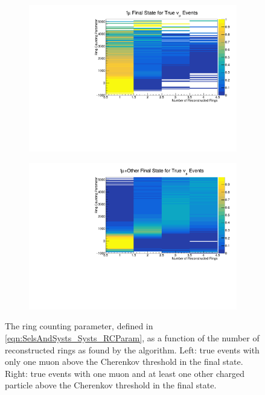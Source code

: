 \begin{figure}[h]
  \begin{subfigure}[t]{0.49\textwidth}
    \includegraphics[width=\textwidth, trim={0mm 0mm 0mm 0mm}, clip,page=1]{Figures/Selections/NuFlavour_14_Top_1.pdf}
  \end{subfigure}%
  \begin{subfigure}[t]{0.49\textwidth}
    \includegraphics[width=\textwidth, trim={0mm 0mm 0mm 0mm}, clip,page=1]{Figures/Selections/NuFlavour_14_Top_3.pdf}
  \end{subfigure}
  \caption{The ring counting parameter, defined in \autoref{eqn:SelsAndSysts_Systs_RCParam}, as a function of the number of reconstructed rings as found by the \fq algorithm. Left: true \quickmath{\nu_{\mu}} events with only one muon above the Cherenkov threshold in the final state. Right: true \quickmath{\nu_{\mu}} events with one muon and at least one other charged particle above the Cherenkov threshold in the final state.}
  \label{fig:SelsAndSysts_RCMaps}
\end{figure}

